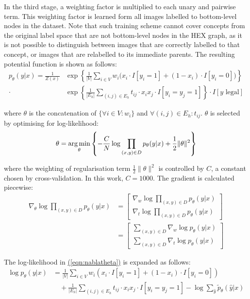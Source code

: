 \documentclass[11pt,a4paper]{article}
\newcommand{\argmin}{\operatornamewithlimits{arg\,min}}
\begin{document}
In the third stage, a weighting factor is multiplied to each unary and pairwise term. This weighting factor is learned form all images labelled to bottom-level nodes in the dataset. Note that such training scheme cannot cover concepts from the original label space that are not bottom-level nodes in the HEX graph, as it is not possible to distinguish between images that are correctly labelled to that concept, or images that are relabelled to its immediate parents. The resulting potential function is shown as follows:
\begin{align}
p_\theta(y|x)=\frac{1}{Z(x)}&\exp\left\{\frac{1}{|V|}\sum_{i\in V}w_i\big(x_i\cdot I[y_i=1]+(1-x_i)\cdot I[y_i=0]\big)\right\}\nonumber\\
\cdot&\exp\left\{\frac{1}{|E_h|}\sum_{(i,j)\in E_h}t_{ij}\cdot x_ix_j\cdot I[y_i=y_j=1]\right\}\cdot I[y\text{ legal}]
\end{align}

where $\theta$ is the concatenation of $\{\forall i\in V:w_i\}$ and $\forall(i,j)\in E_h:t_{ij}$. $\theta$ is selected by optimising for log-likelihood:
\begin{equation}
\theta=\argmin_\theta\left\{-\frac{C}{N}\log\prod_{(x,y)\in D}p_\theta(y|x)+\frac{1}{2}\|\theta\|^2\right\}
\end{equation}

where the weighting of regularisation term $\frac{1}{2}\|\theta\|^2$ is controlled by $C$, a constant chosen by cross-validation. In this work, $C=1000$. The gradient is calculated piecewise:
\begin{align}
\nabla_\theta\log\prod_{(x,y)\in D}p_\theta(y|x)&=\begin{bmatrix}
\nabla_w\log\prod_{(x,y)\in D}p_\theta(y|x)\\ 
\nabla_t\log\prod_{(x,y)\in D}p_\theta(y|x)
\end{bmatrix}\nonumber\\
&=\begin{bmatrix}
\sum_{(x,y)\in D}\nabla_w\log p_\theta(y|x)\\ 
\sum_{(x,y)\in D}\nabla_t\log p_\theta(y|x)
\end{bmatrix}
\label{eqn:nablatheta}
\end{align}

The log-likelihood in \hyperref[eqn:nablatheta]{(\ref{eqn:nablatheta})} is expanded as follows:
\begin{align}
\log p_\theta(y|x)&=\frac{1}{|V|}\sum_{i\in V}w_i(x_i\cdot I[y_i=1]+(1-x_i)\cdot I[y_i=0])\nonumber\\
&\quad+\frac{1}{|E_h|}\sum_{(i,j)\in E_h}t_{ij}\cdot x_ix_j\cdot I[y_i=y_j=1]-\log\sum_{\hat{y}}\tilde{p}_\theta(\hat{y}|x)
\end{align}
\end{document}
